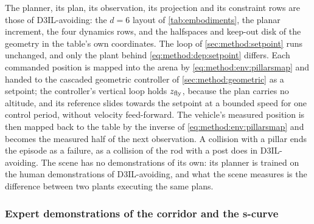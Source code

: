 The planner, its plan, its observation, its projection and its constraint rows are those of D3IL-avoiding:
the $d = 6$ layout of \autoref{tab:embodiments}, the planar increment, the four dynamics rows, and the
halfspaces and keep-out disk of the geometry in the table's own coordinates. The loop of
\autoref{sec:method:setpoint} runs unchanged, and only the plant behind \eqref{eq:method:dep:setpoint}
differs. Each commanded position is mapped into the arena by \eqref{eq:method:env:pillarsmap} and handed
to the cascaded geometric controller of \autoref{sec:method:geometric} as a setpoint; the controller's
vertical loop holds $z_{\textrm{fly}}$, because the plan carries no altitude, and its reference slides towards
the setpoint at a bounded speed for one control period, without velocity feed-forward. The vehicle's
measured position is then mapped back to the table by the inverse of \eqref{eq:method:env:pillarsmap}
and becomes the measured half of the next observation. A collision with a pillar ends the episode as a
failure, as a collision of the rod with a post does in D3IL-avoiding. The scene has no demonstrations of its own:
its planner is trained on the human demonstrations of D3IL-avoiding, and what the scene measures is the
difference between two plants executing the same plans.

\subsubsection*{Expert demonstrations of the corridor and the s-curve}

